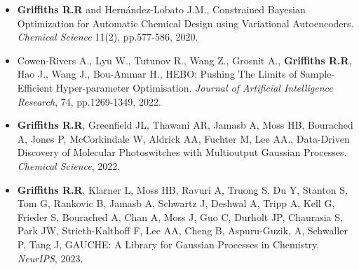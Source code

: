 \documentclass[11pt]{article}
\begin{document}
\begin{itemize}
    \item \textbf{Griffiths R.R} and Hern\'andez-Lobato J.M., Constrained Bayesian Optimization for Automatic Chemical Design using Variational Autoencoders. \textit{Chemical Science} 11(2), pp.577-586, 2020.
\end{itemize}

 

 \vspace{-7em}
\begin{itemize}
 \item Cowen-Rivers A., Lyu W., Tutunov R., Wang Z., Grosnit A., \textbf{Griffiths R.R}, Hao J., Wang J., Bou-Ammar H., HEBO: Pushing The Limits of Sample-Efficient Hyper-parameter Optimisation. \textit{Journal of Artificial Intelligence Research}, 74, pp.1269-1349, 2022.
\end{itemize}

 
 

\begin{itemize}

\item \textbf{Griffiths R.R}, Greenfield JL, Thawani AR, Jamasb A, Moss HB, Bourached A, Jones P, McCorkindale W, Aldrick AA, Fuchter M, Lee AA., Data-Driven Discovery of Molecular Photoswitches with Multioutput Gaussian Processes. \textit{Chemical Science}, 2022.

\end{itemize}

 
 
 

 \begin{itemize}

\item \textbf{Griffiths R.R}, Klarner L, Moss HB, Ravuri A, Truong S, Du Y, Stanton S, Tom G, Rankovic B, Jamasb A, Schwartz J, Deshwal A, Tripp A, Kell G, Frieder S, Bourached A, Chan A, Moss J, Guo C, Durholt JP, Chaurasia S, Park JW, Strieth-Kalthoff F, Lee AA, Cheng B, Aspuru-Guzik, A, Schwaller P, Tang J, GAUCHE: A Library for Gaussian Processes in Chemistry. \textit{NeurIPS}, 2023.

\end{itemize}
 
\end{document}
